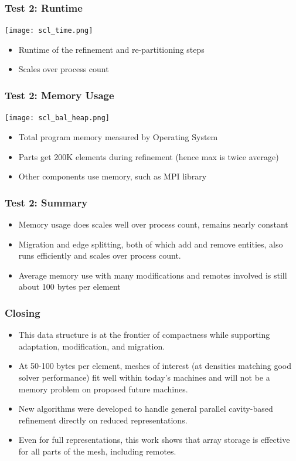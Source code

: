 \documentclass{beamer}
\begin{document}
\begin{frame}
\frametitle{Test 2: Runtime}
\begin{center}
\texttt{[image: scl\_time.png]}
\end{center}
\begin{itemize}
\item Runtime of the refinement and re-partitioning steps
\item Scales over process count
\end{itemize}
\end{frame}

\begin{frame}
\frametitle{Test 2: Memory Usage}
\begin{center}
\texttt{[image: scl\_bal\_heap.png]}
\end{center}
\begin{itemize}
\item Total program memory measured by Operating System
\item Parts get 200K elements during refinement
(hence max is twice average)
\item Other components use memory, such as MPI library
\end{itemize}
\end{frame}

\begin{frame}
\frametitle{Test 2: Summary}
\begin{itemize}
\item Memory usage does scales well over process count,
remains nearly constant
\item Migration and edge splitting, both of which add and remove entities,
also runs efficiently and scales over process count.
\item Average memory use with many modifications and remotes
involved is still about 100 bytes per element
\end{itemize}
\end{frame}

\begin{frame}
\frametitle{Closing}
\begin{itemize}
\item This data structure is at the frontier of compactness while
supporting adaptation, modification, and migration.
\item At 50-100 bytes per element, meshes of interest (at densities
matching good solver performance) fit well within
today's machines and will not be a memory problem on
proposed future machines.
\item New algorithms were developed to handle general parallel
cavity-based refinement directly on reduced representations.
\item Even for full representations, this work shows that array
storage is effective for all parts of the mesh, including remotes.
\end{itemize}
\end{frame}
\end{document}
